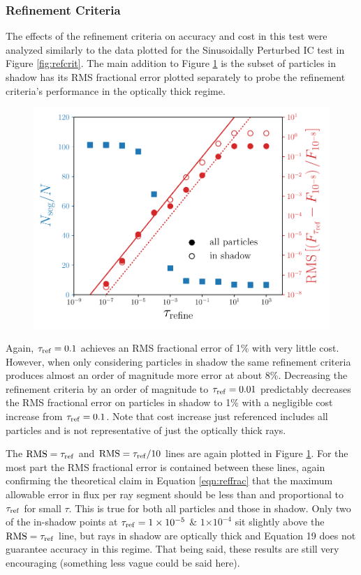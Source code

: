 \documentclass[fleq,usenatbib]{mnras}
\providecommand{\e}[1]{\ensuremath{\times10^{#1}}}
\newcommand{\tr}{\tau_{\rm ref}}
\begin{document}
\subsubsection{Refinement Criteria}
The effects of the refinement criteria on accuracy and cost in this test were 
analyzed similarly to the data plotted for the Sinusoidally Perturbed IC 
test in Figure \ref{fig:refcrit}. The main addition to Figure 
\ref{fig:isosph} is the subset of particles in shadow has its RMS fractional 
error plotted separately to probe the refinement criteria's performance in the 
optically thick regime.
\begin{figure}
\includegraphics[width=1\linewidth]{Figures/isothermal_spheres.pdf}
\caption{}
\label{fig:isosph}
\end{figure}
Again, $\tr=0.1$ achieves an RMS fractional error of 1\% with very 
little cost. However, when only considering particles in shadow the same 
refinement criteria produces almost an order of magnitude more error at about 
8\%. Decreasing the refinement criteria by an order of magnitude to 
$\tr=0.01$ predictably decreases the RMS fractional error on particles in 
shadow to 1\% with a negligible cost increase from $\tr=0.1$. Note that cost 
increase just referenced includes all particles and is not representative of 
just the optically thick rays.

The $\rm{RMS}=\tr$ and $\rm{RMS}=\tr/10$ lines are again plotted in Figure 
\ref{fig:isosph}. For the most part the RMS fractional error is contained 
between these lines, again confirming the theoretical claim in Equation 
\ref{eqn:reffrac} that the maximum allowable error in flux per ray segment 
should be less than and proportional to $\tr$ for small $\tau$. This is true 
for both all particles and those in shadow. Only two of the in-shadow points 
at $\tr=1\e{-5}$ \& $1\e{-4}$ sit slightly above the $\rm{RMS}=\tr$ line, but 
rays in shadow are optically thick and Equation 19 does not guarantee accuracy 
in this regime. That being said, these results are still very encouraging 
(something less vague could be said here).
\end{document}
